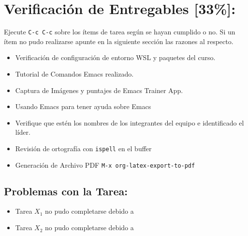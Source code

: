 \documentclass{article}
\begin{document}
\section{Verificación de Entregables [33\%]:}
\label{sec:org8be3e46}
Ejecute \texttt{C-c C-c} sobre los ítems de tarea según se hayan cumplido o
no. Si un ítem no pudo realizarse apunte en la siguiente sección las
razones al respecto.
\begin{itemize}
\item[{$\boxtimes$}] Verificación de configuración de entorno WSL y paquetes del curso.
\item[{$\square$}] Tutorial de Comandos Emacs realizado.
\item[{$\square$}] Captura de Imágenes y puntajes de Emacs Trainer App.
\item[{$\square$}] Usando Emacs para tener ayuda sobre Emacs
\item[{$\square$}] Verifique que estén los nombres de los integrantes del equipo e
identificado el líder.
\item[{$\square$}] Revisión de ortografía con \texttt{ispell} en el buffer
\item[{$\square$}] Generación de Archivo PDF \texttt{M-x org-latex-export-to-pdf}
\end{itemize}
\subsection{Problemas con la Tarea:}
\label{sec:orgdd7e2e0}
\begin{itemize}
\item Tarea \(X_1\) no pudo completarse debido a
\item Tarea \(X_2\) no pudo completarse debido a
\end{itemize}
\end{document}
